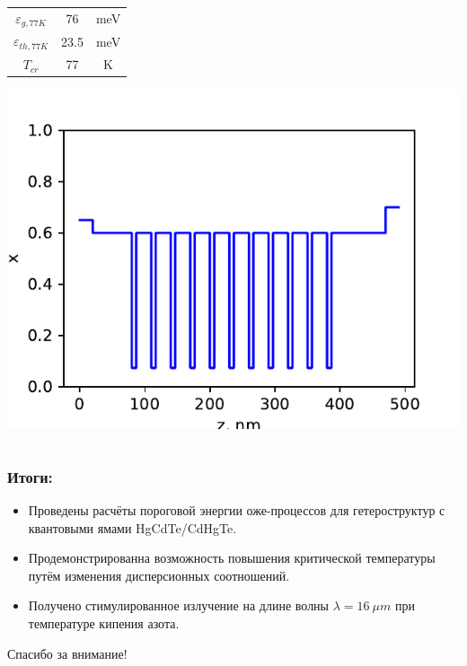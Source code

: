 \documentclass[9pt,pdf]{beamer}
\begin{document}
\begin{frame}
\begin{columns}
\begin{column}{0.3\textwidth}
\begin{center}
\begin{tabular}{c | c c}
                        $\varepsilon_{g, 77K}$ & 76 & meV\\
                        $\varepsilon_{th, 77K}$  & 23.5 & meV\\
                        $T_{cr}$       & 77 & K
                    \end{tabular}
                \end{center}
                \begin{center}
                    \includegraphics[width=1.2\textwidth]{images/xz190225.pdf}
                \end{center}
            \end{column}
        \end{columns}
    \end{frame}
    \begin{frame}
        \frametitle{Итоги:}
        \begin{itemize}
            \item Проведены расчёты пороговой энергии оже-процессов для 
            гетероструктур с квантовыми ямами HgCdTe/CdHgTe. 
            \item Продемонстрированна возможность повышения
            критической температуры путём изменения дисперсионных 
            соотношений.
            \item Получено стимулированное излучение на длине 
            волны $\lambda = 16~\mu m$ при температуре 
            кипения азота. 
        \end{itemize}

        \vspace{1.5cm}

        \begin{center}
            \large{Спасибо за внимание!}
        \end{center}
    \end{frame}
\end{document}
